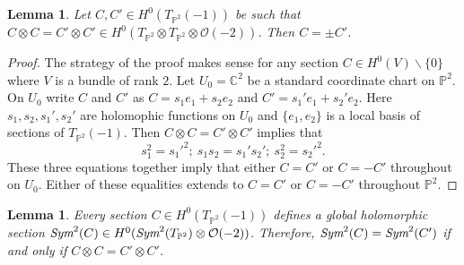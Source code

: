 \documentclass[12pt]{amsart}
\newtheorem{lemma}[theorem]{Lemma}
\theoremstyle{definition}
\theoremstyle{remark}
\numberwithin{equation}{section}
\begin{document}
\begin{lemma}
Let $C, C' \in H^0(T_{\mathbb{P}^2}(-1))$ be such that $C\otimes C = C'\otimes C'\in H^0(T_{\mathbb{P}^2}\otimes T_{\mathbb{P}^2}\otimes\mathcal{O}(-2))$. Then $C=\pm C'$.
\end{lemma}
\begin{proof}
The strategy of the proof makes sense for any section $C\in H^0(V)\backslash\{0\}$ where $V$ is a bundle of rank $2$. Let $U_0 = \mathbb{C}^2$ be a standard coordinate chart on $\mathbb{P}^2$. On $U_0$ write $C$ and $C'$ as $C = s_1e_1 + s_2e_2$ and $C' = s_1'e_1 + s_2'e_2$. Here $s_1, s_2, s_1', s_2'$ are holomophic functions on $U_0$ and $\{e_1, e_2\}$ is a local basis of sections of $T_{\mathbb{P}^2}(-1)$. Then $C\otimes C = C'\otimes C'$ implies that \begin{equation}
s_1^2 = s_1'^2;~ s_1s_2 = s_1's_2';~ s_2^2 = s_2'^2.
\end{equation}
These three equations together imply that either $C = C'$ or $C = - C'$ throughout on $U_0$. Either of these equalities extends to $C = C'$ or $C = - C'$ throughout $\mathbb{P}^2$.
\end{proof}

\begin{lemma}
Every section $C\in H^0(T_{\mathbb{P}^2}(-1))$ defines a global holomorphic section $\emph{Sym}^2(C)\in H^0(\emph{Sym}^2(T_{\mathbb{P}^2})\otimes\mathcal{O}(-2))$. Therefore, $\emph{Sym}^2(C) = \emph{Sym}^2(C')$ if and only if $C\otimes C = C'\otimes C'$.
\end{lemma}
\end{document}
